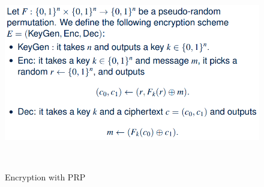 \documentclass[11pt]{article}
\theoremstyle{plain}
\begin{document}
\begin{figure}
	\begin{description}
		\item [{\includegraphics[scale=0.6]{enc-prp}}]~
	\end{description}
	\caption{Encryption with PRP}
	\label{fig:enc-prp}
\end{figure}
\end{document}
